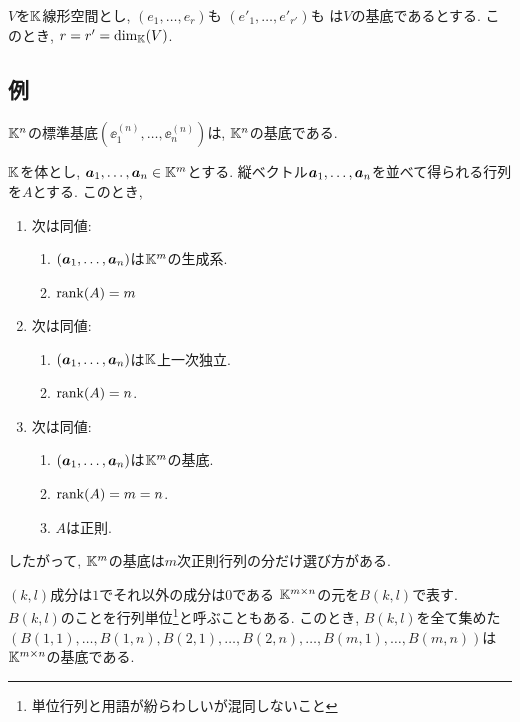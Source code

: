 \begin{cor}
  $V$を$\mathbb{K}$線形空間とし,
  $(e_1,\ldots,e_r)$も
  $(e'_1,\ldots,e'_{r'})$も
  は$V$の基底であるとする.
  このとき, $r=r'=\dim_{\mathbb{K}}(V)$.
\end{cor}



\subsection{例}
\begin{example}
  $\mathbb{K}^n$の標準基底$(\ee^{(n)}_1,\ldots,\ee^{(n)}_n)$は,
  $\mathbb{K}^n$の基底である.
\end{example}

\begin{example}
$\mathbb{K}$を体とし,
  $\boldsymbol{a}_1,\ldots,\boldsymbol{a}_n\in \mathbb{K}^m$とする.
  縦ベクトル$\boldsymbol{a}_1,\ldots,\boldsymbol{a}_n$を並べて得られる行列を$A$とする.
  このとき,
  \begin{enumerate}
  \item 次は同値:
    \begin{enumerate}
      \item $(\boldsymbol{a}_1,\ldots,\boldsymbol{a}_n)$は$\mathbb{K}^m$の生成系.
      \item $\operatorname{rank}(A)=m$
    \end{enumerate}
  \item 次は同値:
    \begin{enumerate}
      \item $(\boldsymbol{a}_1,\ldots,\boldsymbol{a}_n)$は$\mathbb{K}$上一次独立.
      \item $\operatorname{rank}(A)=n$.
    \end{enumerate}
  \item 次は同値:
    \begin{enumerate}
      \item $(\boldsymbol{a}_1,\ldots,\boldsymbol{a}_n)$は$\mathbb{K}^m$の基底.
      \item $\operatorname{rank}(A)=m=n$.
      \item $A$は正則.
    \end{enumerate}
  \end{enumerate}
したがって,
$\mathbb{K}^m$の基底は$m$次正則行列の分だけ選び方がある.
\end{example}

\begin{example}
  $(k,l)$成分は$1$でそれ以外の成分は$0$である
  $\mathbb{K}^{m\times n}$の元を$B(k,l)$で表す.
  $B(k,l)$のことを行列単位\footnote{単位行列と用語が紛らわしいが混同しないこと}と呼ぶこともある.
  このとき,
  $B(k,l)$を全て集めた
  $(B(1,1),\ldots,B(1,n),B(2,1),\ldots,B(2,n),\ldots,B(m,1),\ldots,B(m,n))$は
  $\mathbb{K}^{m\times n}$の基底である.
\end{example}

